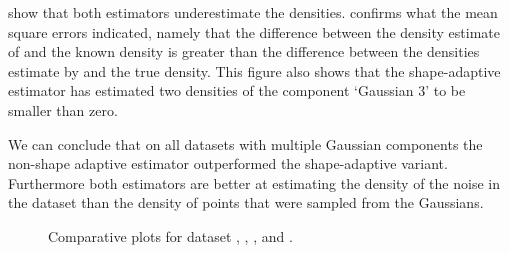 	 show that both estimators underestimate the densities.  confirms what the mean square errors indicated, namely that the difference between the density estimate of \sambe and the known density is greater than the difference between the densities estimate by \mbe and the true density. This figure also shows that the shape-adaptive estimator has estimated two densities of the component `Gaussian 3' to be smaller than zero. 

	We can conclude that on all datasets with multiple Gaussian components the non-shape adaptive estimator outperformed the shape-adaptive variant. Furthermore both estimators are better at estimating the density of the noise in the dataset than the density of points that were sampled from the Gaussians. 

\begin{figure*}
	\centering
	
	\caption{Comparative plots for dataset \ferdosiTwoNum, \ferdosiThreeNum, \baakmanTwoNum, and \baakmanThreeNum.}
	\label{fig:4:resuts:multiSphere}
\end{figure*}